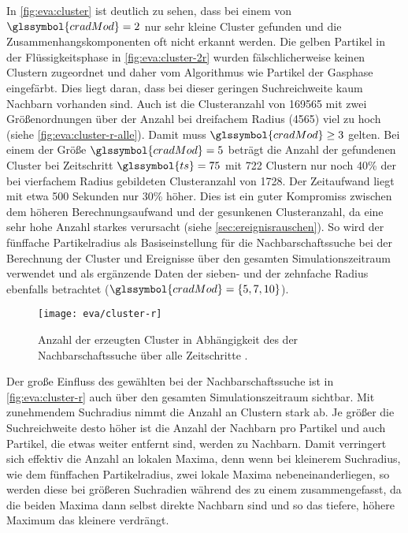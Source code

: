 In \autoref{fig:eva:cluster} ist deutlich zu sehen, dass bei einem  von $\glssymbol{cradMod} = 2$ nur sehr kleine Cluster gefunden und die Zusammenhangskomponenten oft nicht erkannt werden. Die gelben Partikel in der Flüssigkeitsphase in \autoref{fig:eva:cluster-2r} wurden fälschlicherweise keinen Clustern zugeordnet und daher vom Algorithmus wie Partikel der Gasphase eingefärbt. Dies liegt daran, dass bei dieser geringen Suchreichweite kaum Nachbarn vorhanden sind. Auch ist die Clusteranzahl von 169565 mit zwei Größenordnungen über der Anzahl bei dreifachem Radius (4565) viel zu hoch (siehe \autoref{fig:eva:cluster-r-alle}). Damit muss $\glssymbol{cradMod} \ge 3$ gelten. Bei einem  der Größe $\glssymbol{cradMod} = 5$ beträgt die Anzahl der gefundenen Cluster bei Zeitschritt $\glssymbol{ts} = 75$ mit 722 Clustern nur noch 40\% der bei vierfachem Radius gebildeten Clusteranzahl von 1728. Der Zeitaufwand liegt mit etwa 500 Sekunden nur 30\% höher. Dies ist ein guter Kompromiss zwischen dem höheren Berechnungsaufwand und der gesunkenen Clusteranzahl, da eine sehr hohe Anzahl starkes  verursacht (siehe \autoref{sec:ereignisrauschen}). So wird der fünffache Partikelradius als Basiseinstellung für die Nachbarschaftssuche bei der Berechnung der Cluster und Ereignisse über den gesamten Simulationszeitraum verwendet und als ergänzende Daten der sieben- und der zehnfache Radius ebenfalls betrachtet ($\glssymbol{cradMod} = \{5, 7, 10\}$).

\begin{figure}
	\texttt{[image: eva/cluster-r]}
	\caption{Anzahl der erzeugten Cluster in Abhängigkeit des   der Nachbarschaftssuche über alle Zeitschritte .}\label{fig:eva:cluster-r}
\end{figure}

Der große Einfluss des gewählten  bei der Nachbarschaftssuche ist in \autoref{fig:eva:cluster-r} auch über den gesamten Simulationszeitraum sichtbar. Mit zunehmendem Suchradius nimmt die Anzahl an Clustern stark ab. Je größer die Suchreichweite desto höher ist die Anzahl der Nachbarn pro Partikel und auch Partikel, die etwas weiter entfernt sind, werden zu Nachbarn. Damit verringert sich effektiv die Anzahl an lokalen Maxima, denn wenn bei kleinerem Suchradius, wie dem fünffachen Partikelradius, zwei lokale Maxima nebeneinanderliegen, so werden diese bei größeren Suchradien während des \SECC zu einem zusammengefasst, da die beiden Maxima dann selbst direkte Nachbarn sind und so das tiefere, höhere Maximum das kleinere verdrängt.

